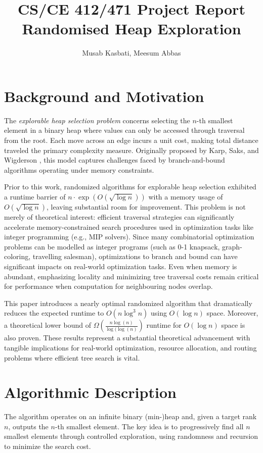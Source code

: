 \documentclass[conference]{IEEEtran}
\title{CS/CE 412/471 Project Report \\ Randomised Heap Exploration}
\author{Musab Kasbati, Meesum Abbas}
\date{}
\begin{document}
\maketitle

\section{Background and Motivation}

The \textit{explorable heap selection problem} concerns selecting the $n$-th smallest element in a binary heap where values can only be accessed through traversal from the root. Each move across an edge incurs a unit cost, making total distance traveled the primary complexity measure. Originally proposed by Karp, Saks, and Wigderson \cite{karp1986search}, this model captures challenges faced by branch-and-bound algorithms operating under memory constraints.

Prior to this work, randomized algorithms for explorable heap selection exhibited a runtime barrier of $n \cdot \exp(O(\sqrt{\log n}))$ with a memory usage of $O(\sqrt{\log n})$, leaving substantial room for improvement. This problem is not merely of theoretical interest: efficient traversal strategies can significantly accelerate memory-constrained search procedures used in optimization tasks like integer programming (e.g., MIP solvers). Since many combinatorial optimization problems can be modelled as integer programs (such as 0-1 knapsack, graph-coloring, travelling salesman), optimizations to branch and bound can have significant impacts on real-world optimization tasks. Even when memory is abundant, emphasizing locality and minimizing tree traversal costs remain critical for performance when computation for neighbouring nodes overlap. 

This paper introduces a nearly optimal randomized algorithm that dramatically reduces the expected runtime to $O(n \log^3 n)$ using $O(\log n)$ space. Moreover, a theoretical lower bound of $\Omega(\frac{n \log(n)}{\log(\log (n)})$ runtime for $O(\log n)$ space is also proven. These results represent a substantial theoretical advancement with tangible implications for real-world optimization, resource allocation, and routing problems where efficient tree search is vital.

\section{Algorithmic Description}

The algorithm operates on an infinite binary (min-)heap and, given a target rank $n$, outputs the $n$-th smallest element. The key idea is to progressively find all $n$ smallest elements through controlled exploration, using randomness and recursion to minimize the search cost.
\end{document}

